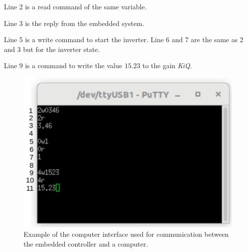 Line 2 is a read command of the same variable. 

Line 3 is the reply from the embedded system.

Line 5 is a write command to start the inverter. Line 6 and 7 are the same as 2 and 3 but for the inverter state.

Line 9 is a command to write the value $15.23$ to the gain \textit{Ki\textunderscore Q}.

\begin{figure}[H]
	\centering
	\includegraphics[width=0.65\linewidth]{pictures/software/pc_interface_terminal.png}
	\caption{Example of the computer interface used for communication between the embedded controller and a computer.}
	\label{fig:pc_interface}
\end{figure}
